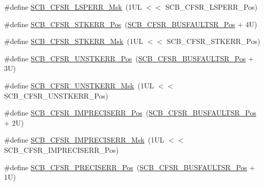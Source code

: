 \begin{DoxyCompactItemize}
\item 
\#define \mbox{\hyperlink{group___c_m_s_i_s___s_c_b_ga8af8c68915f63358325fb4ebc5d7acc1}{S\+C\+B\+\_\+\+C\+F\+S\+R\+\_\+\+L\+S\+P\+E\+R\+R\+\_\+\+Msk}}~(1\+U\+L $<$$<$ S\+C\+B\+\_\+\+C\+F\+S\+R\+\_\+\+L\+S\+P\+E\+R\+R\+\_\+\+Pos)
\item 
\#define \mbox{\hyperlink{group___c_m_s_i_s___s_c_b_ga62a8fe875fb6cc28e0e36ddf27d81a8f}{S\+C\+B\+\_\+\+C\+F\+S\+R\+\_\+\+S\+T\+K\+E\+R\+R\+\_\+\+Pos}}~(\mbox{\hyperlink{group___c_m_s_i_s___s_c_b_ga555a24f4f57d199f91d1d1ab7c8c3c8a}{S\+C\+B\+\_\+\+C\+F\+S\+R\+\_\+\+B\+U\+S\+F\+A\+U\+L\+T\+S\+R\+\_\+\+Pos}} + 4\+U)
\item 
\#define \mbox{\hyperlink{group___c_m_s_i_s___s_c_b_ga77076fdfa5941327d4d8f0cb99653872}{S\+C\+B\+\_\+\+C\+F\+S\+R\+\_\+\+S\+T\+K\+E\+R\+R\+\_\+\+Msk}}~(1\+U\+L $<$$<$ S\+C\+B\+\_\+\+C\+F\+S\+R\+\_\+\+S\+T\+K\+E\+R\+R\+\_\+\+Pos)
\item 
\#define \mbox{\hyperlink{group___c_m_s_i_s___s_c_b_ga7f70b590d3d8f11145e4ff20f7c9f3e8}{S\+C\+B\+\_\+\+C\+F\+S\+R\+\_\+\+U\+N\+S\+T\+K\+E\+R\+R\+\_\+\+Pos}}~(\mbox{\hyperlink{group___c_m_s_i_s___s_c_b_ga555a24f4f57d199f91d1d1ab7c8c3c8a}{S\+C\+B\+\_\+\+C\+F\+S\+R\+\_\+\+B\+U\+S\+F\+A\+U\+L\+T\+S\+R\+\_\+\+Pos}} + 3\+U)
\item 
\#define \mbox{\hyperlink{group___c_m_s_i_s___s_c_b_ga2dfce5c289681884651f92377d09380e}{S\+C\+B\+\_\+\+C\+F\+S\+R\+\_\+\+U\+N\+S\+T\+K\+E\+R\+R\+\_\+\+Msk}}~(1\+U\+L $<$$<$ S\+C\+B\+\_\+\+C\+F\+S\+R\+\_\+\+U\+N\+S\+T\+K\+E\+R\+R\+\_\+\+Pos)
\item 
\#define \mbox{\hyperlink{group___c_m_s_i_s___s_c_b_gaec426f59eb8d75acd48b32953ac154f5}{S\+C\+B\+\_\+\+C\+F\+S\+R\+\_\+\+I\+M\+P\+R\+E\+C\+I\+S\+E\+R\+R\+\_\+\+Pos}}~(\mbox{\hyperlink{group___c_m_s_i_s___s_c_b_ga555a24f4f57d199f91d1d1ab7c8c3c8a}{S\+C\+B\+\_\+\+C\+F\+S\+R\+\_\+\+B\+U\+S\+F\+A\+U\+L\+T\+S\+R\+\_\+\+Pos}} + 2\+U)
\item 
\#define \mbox{\hyperlink{group___c_m_s_i_s___s_c_b_ga6e6b3b643e1c2e14c96f10b42d59fc64}{S\+C\+B\+\_\+\+C\+F\+S\+R\+\_\+\+I\+M\+P\+R\+E\+C\+I\+S\+E\+R\+R\+\_\+\+Msk}}~(1\+U\+L $<$$<$ S\+C\+B\+\_\+\+C\+F\+S\+R\+\_\+\+I\+M\+P\+R\+E\+C\+I\+S\+E\+R\+R\+\_\+\+Pos)
\item 
\#define \mbox{\hyperlink{group___c_m_s_i_s___s_c_b_gaf4744e87d7f6eddbff803977901d6ad0}{S\+C\+B\+\_\+\+C\+F\+S\+R\+\_\+\+P\+R\+E\+C\+I\+S\+E\+R\+R\+\_\+\+Pos}}~(\mbox{\hyperlink{group___c_m_s_i_s___s_c_b_ga555a24f4f57d199f91d1d1ab7c8c3c8a}{S\+C\+B\+\_\+\+C\+F\+S\+R\+\_\+\+B\+U\+S\+F\+A\+U\+L\+T\+S\+R\+\_\+\+Pos}} + 1\+U)

\end{DoxyCompactItemize}

